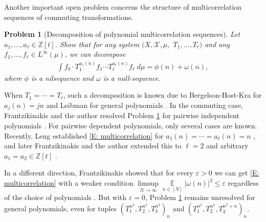 \documentclass[11pt]{amsart}
\newtheorem{problem}{Problem}
\theoremstyle{definition}
\DeclareMathOperator*{\E}{\mathbb{E}}
\newcommand{\Z}{{\mathbb Z}}
\newcommand{\CX}{{\mathcal X}}
\newcommand{\veps}{\varepsilon}
\newcommand{\1}{{\mathbf{1}}}
\begin{document}
Another important open problem concerns the structure of multicorrelation sequences of commuting transformations.
\begin{problem}[Decomposition of polynomial multicorrelation sequences]\label{Pr: multicorrelation decomposition}
    Let $a_1, \ldots, a_\ell\in\Z[t]$. Show that for any system $(X, \CX, \mu,$\! $T_1, \ldots, T_\ell)$ and any $f_1, \ldots, f_\ell\in L^\infty(\mu)$, we can decompose 
    \begin{align}\label{E: multicorrelation}
        \int f_0\cdot T_1^{a_1(n)}f_1\cdots T_\ell^{a_\ell(n)}f_\ell\; d\mu = \phi(n) + \omega(n),
    \end{align}
    where $\phi$ is a nilsequence and $\omega$ is a null-sequence.
\end{problem}
When $T_1 = \cdots = T_\ell$, such a decomposition is known due to Bergelson-Host-Kra for $a_j(n) = j n$ \cite[Theorem 1.9]{BHK05} and Leibman for general polynomials \cite[Theorem 3.1]{L10}. In the commuting case, Frantzikinakis and the author resolved Problem \ref{Pr: multicorrelation decomposition} for pairwise independent polynomials \cite[Theorem 2.17]{FrKu22a}. For pairwise dependent polynomials, only several cases are known. Recently, Leng established \eqref{E: multicorrelation} for $a_1(n) = \cdots = a_\ell(n) = n$ \cite[Theorem 1.6]{Leng25}, and later Frantzikinakis and the author extended this to $\ell=2$ and arbitrary $a_1 = a_2\in\Z[t]$ \cite[Theorem 1.6]{FrKu25}. 

In a different direction, Frantzikinakis showed that for every $\veps>0$ we can get \eqref{E: multicorrelation} with a weaker condition $\limsup\limits_{N\to\infty}\E\limits_{n\in[N]}|\omega(n)|^2 \leq \veps$ regardless of the choice of polynomials \cite[Theorem 1.1]{Fr15}. But with $\veps = 0$, Problem \ref{Pr: multicorrelation decomposition} remains unresolved for general polynomials, even for tuples $(T_1^{n^2}, T_2^{n^2}, T_3^{n^2})_n$ and $(T_1^{n^2}, T_2^{n^2}, T_3^{n^2+n})_n$.
\end{document}
